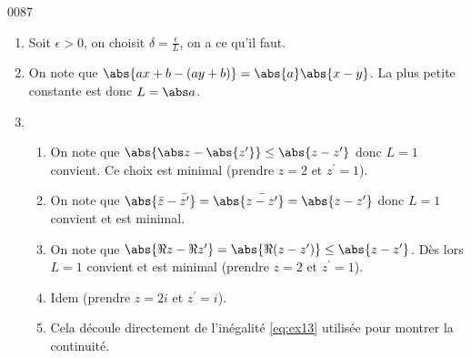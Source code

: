 
\begin{corrige}{0087}

\begin{enumerate}
\item Soit $\epsilon > 0$, on choisit $\delta = \frac\epsilon L$, on a ce qu'il faut.
\item On note que $\abs{a x + b - (a y + b)} = \abs{a}\abs{x-y}$. La plus petite constante est donc $L = \abs a$.
\item
  \begin{enumerate}
  \item On note que $\abs{\abs z - \abs {z^\prime}} \leq
    \abs{z-z^\prime}$ donc $L = 1$ convient. Ce choix est minimal
    (prendre $z = 2$ et $z^\prime = 1$).
  \item On note que $\abs{\bar z - \bar{z^\prime}} =
    \abs{\bar{z-z^\prime}} = \abs{z-z^\prime}$ donc $L = 1$ convient
    et est minimal.
  \item On note que $\abs{\Re z - \Re z^\prime} = \abs{\Re
      (z-z^\prime)} \leq \abs{z-z^\prime}$. Dès lors $L = 1$ convient
    et est minimal (prendre $z = 2$ et $z^\prime = 1$).
  \item Idem (prendre $z=2i$ et $z^\prime = i$).
  \item Cela découle directement de l'inégalité \eqref{eq:ex13} utilisée pour montrer la continuité.
\end{enumerate}

\end{enumerate}

\end{corrige}
